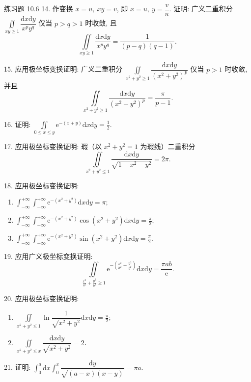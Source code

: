 \begin{exblock}{练习题 10.6}
14. 作变换 $x = u,\ xy = v$, 即 $x = u,\ y = \dfrac{v}{u}$.
证明: 广义二重积分 $\iint\limits_{xy \geqslant 1} \dfrac{\mathrm{d}x\mathrm{d}y}{x^{p}y^{q}}$
仅当 $p > q > 1$ 时收敛, 且
\[
\iint\limits_{xy \geqslant 1} \dfrac{\mathrm{d}x\mathrm{d}y}{x^{p}y^{q}}
= \frac{1}{(p-q)(q-1)}.
\]

15. 应用极坐标变换证明: 广义二重积分
$\iint\limits_{x^{2}+y^{2} \geqslant 1} \dfrac{\mathrm{d}x\mathrm{d}y}{(x^{2}+y^{2})^{p}}$
仅当 $p > 1$ 时收敛, 并且
\[
\iint\limits_{x^{2}+y^{2} \geqslant 1} \dfrac{\mathrm{d}x\mathrm{d}y}{(x^{2}+y^{2})^{p}}
= \frac{\pi}{p-1}.
\]

16. 证明: $\displaystyle \iint\limits_{0 \leqslant x \leqslant y} \mathrm{e}^{-(x+y)} \mathrm{d}x \mathrm{d}y
= \frac{1}{2}$.

17. 应用极坐标变换证明: 瑕（以 $x^{2}+y^{2}=1$ 为瑕线）二重积分
\[
\iint\limits_{x^{2}+y^{2} \leqslant 1}
\frac{\mathrm{d}x\mathrm{d}y}{\sqrt{1-x^{2}-y^{2}}} = 2\pi.
\]

18. 应用极坐标变换证明:
\begin{enumerate}
\item[(1)] $\displaystyle \int_{-\infty}^{+\infty} \int_{-\infty}^{+\infty}
\mathrm{e}^{-(x^{2}+y^{2})} \mathrm{d}x \mathrm{d}y = \pi$;
\item[(2)] $\displaystyle \int_{-\infty}^{+\infty} \int_{-\infty}^{+\infty}
\mathrm{e}^{-(x^{2}+y^{2})} \cos(x^{2}+y^{2}) \mathrm{d}x\mathrm{d}y = \frac{\pi}{2}$;
\item[(3)] $\displaystyle \int_{-\infty}^{+\infty} \int_{-\infty}^{+\infty}
\mathrm{e}^{-(x^{2}+y^{2})} \sin(x^{2}+y^{2}) \mathrm{d}x\mathrm{d}y = \frac{\pi}{2}$.
\end{enumerate}

19. 应用广义极坐标变换证明:
\[
\iint\limits_{\frac{x^{2}}{a^{2}}+\frac{y^{2}}{b^{2}} \geqslant 1}
\mathrm{e}^{-\left( \frac{x^{2}}{a^{2}}+\frac{y^{2}}{b^{2}} \right)} \mathrm{d}x\mathrm{d}y
= \frac{\pi ab}{\mathrm{e}}.
\]

20. 应用极坐标变换证明:
\begin{enumerate}
\item[(1)] $\displaystyle \iint\limits_{x^{2}+y^{2} \leqslant 1}
\ln\dfrac{1}{\sqrt{x^{2}+y^{2}}} \mathrm{d}x\mathrm{d}y = \frac{\pi}{2}$;
\item[(2)] $\displaystyle \iint\limits_{x^{2}+y^{2} \leqslant x}
\dfrac{\mathrm{d}x\mathrm{d}y}{\sqrt{x^{2}+y^{2}}} = 2$.
\end{enumerate}

21. 证明: $\displaystyle \int_{0}^{a} \mathrm{d}x \int_{0}^{x}
\dfrac{\mathrm{d}y}{\sqrt{(a-x)(x-y)}} = \pi a$.


\end{exblock}
